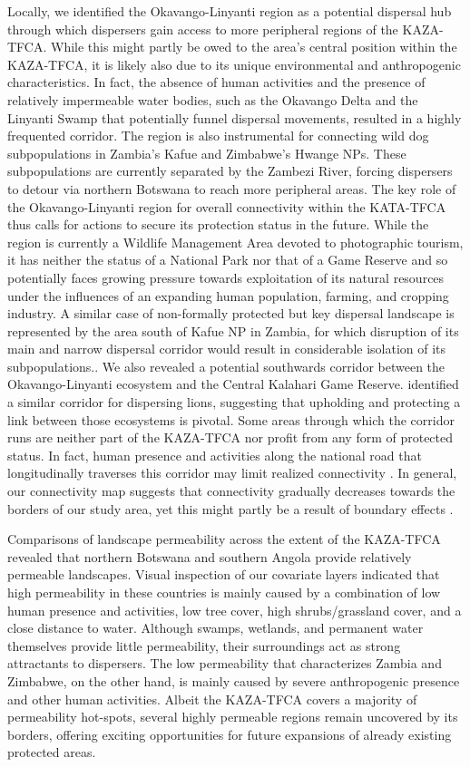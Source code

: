 \documentclass[abstract=on,10pt,a4paper,bibliography=totocnumbered]{article}
\begin{document}
Locally, we identified the Okavango-Linyanti region as a potential dispersal hub
through which dispersers gain access to more peripheral regions of the
KAZA-TFCA. While this might partly be owed to the area's central position within
the KAZA-TFCA, it is likely also due to its unique environmental and
anthropogenic characteristics. In fact, the absence of human activities and the
presence of relatively impermeable water bodies, such as the Okavango Delta and
the Linyanti Swamp that potentially funnel dispersal movements, resulted in a
highly frequented corridor. The region is also instrumental for connecting wild
dog subpopulations in Zambia's Kafue and Zimbabwe's Hwange NPs. These
subpopulations are currently separated by the Zambezi River, forcing dispersers
to detour via northern Botswana to reach more peripheral areas. The key role of
the Okavango-Linyanti region for overall connectivity within the KATA-TFCA thus
calls for actions to secure its protection status in the future. While the
region is currently a Wildlife Management Area devoted to photographic tourism,
it has neither the status of a National Park nor that of a Game Reserve and so
potentially faces growing pressure towards exploitation of its natural resources
under the influences of an expanding human population, farming, and cropping
industry. A similar case of non-formally protected but key dispersal landscape
is represented by the area south of Kafue NP in Zambia, for which disruption of
its main and narrow dispersal corridor would result in considerable isolation of
its subpopulations.. We also revealed a potential southwards corridor between
the Okavango-Linyanti ecosystem and the Central Kalahari Game Reserve.
\cite{Elliot.2014} identified a similar corridor for dispersing lions,
suggesting that upholding and protecting a link between those ecosystems is
pivotal. Some areas through which the corridor runs are neither part of the
KAZA-TFCA nor profit from any form of protected status. In fact, human presence
and activities along the national road that longitudinally traverses this
corridor may limit realized connectivity \citep{Cozzi.2020}. In general, our
connectivity map suggests that connectivity gradually decreases towards the
borders of our study area, yet this might partly be a result of boundary effects
\citep{Koen.2010}.

Comparisons of landscape permeability across the extent of the KAZA-TFCA
revealed that northern Botswana and southern Angola provide relatively permeable
landscapes. Visual inspection of our covariate layers indicated that high
permeability in these countries is mainly caused by a combination of low human
presence and activities, low tree cover, high shrubs/grassland cover, and a
close distance to water. Although swamps, wetlands, and permanent water
themselves provide little permeability, their surroundings act as strong
attractants to dispersers. The low permeability that characterizes Zambia and
Zimbabwe, on the other hand, is mainly caused by severe anthropogenic presence
and other human activities. Albeit the KAZA-TFCA covers a majority of
permeability hot-spots, several highly permeable regions remain uncovered by its
borders, offering exciting opportunities for future expansions of already
existing protected areas.
\end{document}
